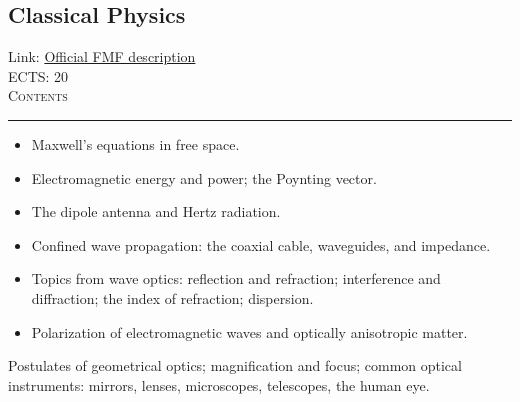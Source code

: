 \documentclass[11pt, a4paper]{article}
\newenvironment{course}[3]{
\subsection{#1}%
Link: \href{#2}{Official FMF description}\\%
ECTS: #3%
\vspace{1ex}
\\
{\large \textsc{Contents}}\\[-0.9ex]%
\rule{\textwidth}{0.5pt}
\vspace{-3ex}
}
{}
\newenvironment{chapter}[1]{
\begin{tcolorbox}[title=#1, breakable]
}
{\end{tcolorbox}}
\begin{document}
\begin{course}{Classical Physics}{https://www.fmf.uni-lj.si/en/study-physics/programmes/1fiz/2020/7000777/courses/1154/}{20}
\begin{chapter}{Electromagnetic wave propagation}
    \begin{itemize}

        \item Maxwell’s equations in free space.

        \item Electromagnetic energy and power; the Poynting vector.

        \item The dipole antenna and Hertz radiation.

        \item Confined wave propagation: the coaxial cable, waveguides, and impedance.

        \item Topics from wave optics: reflection and refraction; interference and diffraction; the index of refraction; dispersion.

        \item Polarization of electromagnetic waves and optically anisotropic matter.

    \end{itemize}
\end{chapter}

\begin{chapter}{Geometrical optics}
    Postulates of geometrical optics; magnification and focus; common optical instruments: mirrors, lenses, microscopes, telescopes, the human eye.
\end{chapter}

\end{course}
\end{document}
